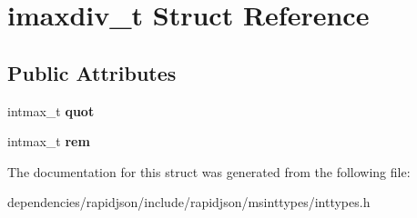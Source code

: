 \hypertarget{structimaxdiv__t}{}\section{imaxdiv\+\_\+t Struct Reference}
\label{structimaxdiv__t}
\subsection*{Public Attributes}
\begin{DoxyCompactItemize}
\item 
\mbox{\label{structimaxdiv__t_a9339814cbb7610c72fb7d30c6573b393}} 
intmax\+\_\+t {\bfseries quot}
\item 
\mbox{\label{structimaxdiv__t_a6c9701ad10bff81edae7ff679cae7850}} 
intmax\+\_\+t {\bfseries rem}
\end{DoxyCompactItemize}


The documentation for this struct was generated from the following file\+:\begin{DoxyCompactItemize}
\item 
dependencies/rapidjson/include/rapidjson/msinttypes/inttypes.\+h\end{DoxyCompactItemize}
